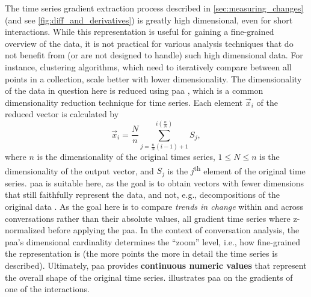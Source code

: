 The time series gradient extraction process described in \cref{sec:measuring_changes} (and see \cref{fig:diff_and_derivatives}) is greatly high dimensional, even for short interactions.
While this representation is useful for gaining a fine-grained overview of the data, it is not practical for various analysis techniques that do not benefit from (or are not designed to handle) such high dimensional data.
For instance, clustering algorithms, which need to iteratively compare between all points in a collection, scale better with lower dimensionality.
The dimensionality of the data in question here is reduced using \acf{paa} \citep{Keogh2001dimensionality}, which is a common dimensionality reduction technique for time series.
Each element $\vec{x}_i$ of the reduced vector is calculated by
%
\begin{equation}
	\label{eq:paa}
	\vec{x}_i = \frac{N}{n} \sum_{j=\frac{n}{N}(i-1)+1}^{i(\frac{n}{N})} S_j,
\end{equation}
\noindent
%
where $n$ is the dimensionality of the original times series, $1 \leq N \leq n$ is the dimensionality of the output vector, and $S_j$ is the $j$\textsuperscript{th} element of the original time series.
\Ac{paa} is suitable here, as the goal is to obtain vectors with fewer dimensions that still faithfully represent the data, and not, e.g., decompositions of the original data \citep[cf.\ method survey in][pp.~271-275]{Keogh2001dimensionality}.
As the goal here is to compare \emph{trends in change} within and across conversations rather than their absolute values, all gradient time series where z-normalized before applying the \ac{paa}.
In the context of conversation analysis, the \ac{paa}'s dimensional cardinality determines the \enquote{zoom} level, i.e., how fine-grained the representation is (the more points the more in detail the time series is described).
Ultimately, \ac{paa} provides \textbf{continuous numeric values} that represent the overall shape of the original time series.
 illustrates \ac{paa} on the gradients of one of the interactions.

